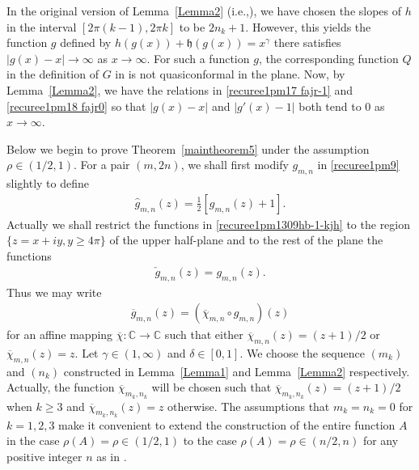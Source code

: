 \documentclass[12pt]{amsart}
\numberwithin{equation}{section}
\begin{document}
In the original version of Lemma~\ref{Lemma2} (i.e.,\cite[Lemma~2.1]{Zhang2024}), we have chosen the slopes of $h$ in the interval $[2\pi(k-1),2\pi k]$ to be $2n_k+1$. However, this yields the function $g$ defined by $h(g(x))+\mathfrak{h}(g(x))=x^{\gamma}$ there satisfies $|g(x)-x|\to\infty$ as $x\to\infty$. For such a function $g$, the corresponding function $Q$ in the definition of $G$ in \cite[Subsection~2.2]{Zhang2024} is not quasiconformal in the plane. Now, by Lemma~\ref{Lemma2}, we have the relations in \eqref{recuree1pm17  fajr-1} and \eqref{recuree1pm18   fajr0} so that $|g(x)-x|$ and $|g'(x)-1|$ both tend to $0$ as $x\to\infty$.

Below we begin to prove Theorem~\ref{maintheorem5} under the assumption $\rho\in(1/2,1)$. For a pair $(m,2n)$, we shall first modify $g_{m,n}$ in \eqref{recuree1pm9} slightly to define
\begin{equation}\label{recuree1pm1309hb-1-kjh}
\begin{split}
\hat{g}_{m,n}(z)=\frac{1}{2}[g_{m,n}(z)+1].
\end{split}
\end{equation}
Actually we shall restrict the functions in \eqref{recuree1pm1309hb-1-kjh} to the region $\{z=x+iy, y\geq4\pi\}$ of the upper half-plane and to the rest of the plane the functions
\begin{equation}\label{recuree1pm1309hb-1-kjh-j87}
\begin{split}
\check{g}_{m,n}(z)=g_{m,n}(z).
\end{split}
\end{equation}
Thus we may write
\begin{equation}\label{recuree1pm1309hb-1-kjh-1}
\begin{split}
\overline{g}_{m,n}(z)=(\overline{\chi}_{m,n}\circ g_{m,n})(z)
\end{split}
\end{equation}
for an affine mapping $\overline{\chi}: \mathbb{C}\to \mathbb{C}$ such that either $\overline{\chi}_{m,n}(z)=(z+1)/2$ or $\overline{\chi}_{m,n}(z)=z$. Let $\gamma\in(1,\infty)$ and $\delta\in[0,1]$. We choose the sequence $(m_k)$ and $(n_k)$ constructed in Lemma~\ref{Lemma1} and Lemma~\ref{Lemma2} respectively. Actually, the function $\overline{\chi}_{m_k,n_k}$ will be chosen such that $\overline{\chi}_{m_k,n_k}(z)=(z+1)/2$ when $k\geq 3$ and $\overline{\chi}_{m_k,n_k}(z)=z$ otherwise. The assumptions that $m_k=n_k=0$ for $k=1,2,3$ make it convenient to extend the construction of the entire function $A$ in the case $\rho(A)=\rho\in(1/2,1)$ to the case $\rho(A)=\rho\in(n/2,n)$ for any positive integer $n$ as in \cite[Section~5]{Bergweilereremenko2019}.
\end{document}

